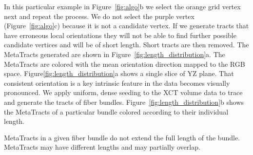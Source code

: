 In this particular example in Figure~\ref{fig:algo}b we select the orange grid vertex next and repeat the process. We do not select the purple vertex (Figure~\ref{fig:algo}c) because it is not a candidate vertex. If we generate tracts that have erroneous local orientations they will not be able to find further possible candidate vertices and will be of short length. Short tracts are then removed. The MetaTracts generated are shown in Figure~\ref{fig:length_distribution}a. The MetaTracts are colored with the mean orientation direction mapped to the RGB space. Figure\ref{fig:length_distribution}a shows a single slice of YZ plane. That consistent orientation is a key intrinsic feature in the data becomes visually pronounced.
We apply uniform, dense seeding to the XCT volume data to trace and generate the tracts of fiber bundles. Figure~\ref{fig:length_distribution}b shows the MetaTracts of a particular bundle colored according to their individual length.

MetaTracts in a given fiber bundle do not extend the full length of the bundle. MetaTracts may have different lengths and may partially overlap.
 
 
%
 


